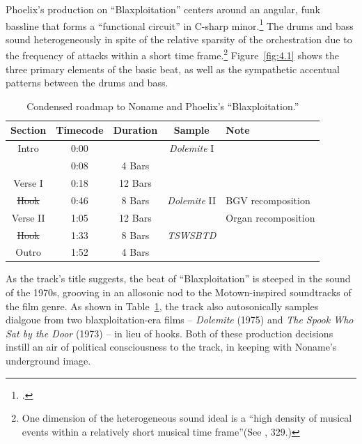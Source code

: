Phoelix's production on ``Blaxploitation'' centers around an angular, funk bassline that forms a ``functional circuit'' in C-sharp minor.\footnote{\cite{kyleadamsHarmonicSyntacticMotivic2020}.} The drums and bass sound heterogeneously in spite of the relative sparsity of the orchestration due to the frequency of attacks within a short time frame.\footnote{One dimension of the heterogeneous sound ideal is a ``high density of musical events within a relatively short musical time frame''(See \cite{ollywilsonHeterogeneousSoundIdeal1992}, 329.)} Figure~\ref{fig:4.1} shows the three primary elements of the basic beat, as well as the sympathetic accentual patterns between the drums and bass.

\begin{table}[ht]
    \centering
    \begin{tabular}{|c|c|c|c|l|}
         \hline
        Section     & Timecode & Duration    & Sample               & Note \\ \hline
        Intro       & 0:00     &             & \textit{Dolemite} I  & \\ \hline
                    & 0:08     & 4 Bars      &                      & \\ \hline
        Verse I     & 0:18     & 12 Bars     &                      & \\ \hline
        \sout{Hook} & 0:46     & 8 Bars      & \textit{Dolemite} II & BGV recomposition \\ \hline
        Verse II    & 1:05     & 12 Bars     &                      & Organ recomposition \\ \hline
        \sout{Hook} & 1:33     & 8 Bars      & \textit{TSWSBTD}     & \\ \hline
        Outro       & 1:52     & 4 Bars      &                      & \\ \hline
    \end{tabular}
    \caption{Condensed roadmap to Noname and Phoelix's ``Blaxploitation.''}
    \label{tab:blaxploitation}
\end{table}

As the track's title suggests, the beat of ``Blaxploitation'' is steeped in the sound of the 1970s, grooving in an allosonic nod to the Motown-inspired soundtracks of the film genre. As shown in Table~\ref{tab:blaxploitation}, the track also autosonically samples dialgoue from two blaxploitation-era films – \textit{Dolemite} (1975) and \textit{The Spook Who Sat by the Door} (1973) – in lieu of hooks. Both of these production decisions instill an air of political consciousness to the track, in keeping with Noname's underground image. 

